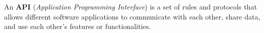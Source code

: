 An \textbf{API} (\textit{Application Programming Interface}) is a set of rules and protocols that allows different software applications to communicate with each other, share data, and use each other's features or functionalities.
